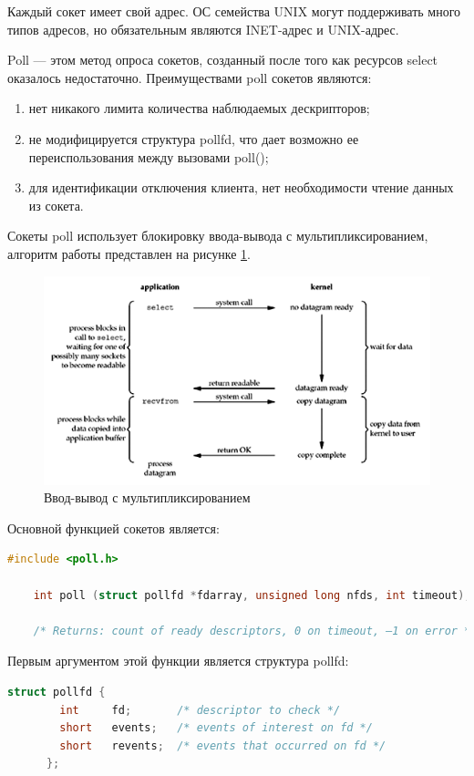 Каждый сокет имеет свой адрес.
ОС семейства UNIX могут поддерживать много типов адресов, но обязательным являются INET-адрес и UNIX-адрес.

Poll --- этом метод опроса сокетов, созданный после того как ресурсов select оказалось недостаточно.
Преимуществами poll сокетов являются:
\begin{enumerate}
    \item нет никакого лимита количества наблюдаемых дескрипторов;
    \item не модифицируется структура pollfd, что дает возможно ее переиспользования между вызовами poll();
    \item для идентификации отключения клиента, нет необходимости чтение данных из сокета.
\end{enumerate}

Сокеты poll использует блокировку ввода-вывода с мультипликсированием, алгоритм работы представлен на рисунке \ref{fig:anal:use-case}.

\begin{figure}[ht!]
	\centering
	\includegraphics[width=0.7\linewidth]{assets/images/figure_6.3.png}
	\caption{Ввод-вывод с мультипликсированием}
	\label{fig:anal:use-case}
\end{figure}
\FloatBarrier

Основной функцией сокетов является:

\begin{lstlisting}[language=c, label=some-code, caption=Функция poll]
    #include <poll.h>

    int poll (struct pollfd *fdarray, unsigned long nfds, int timeout);
    
    /* Returns: count of ready descriptors, 0 on timeout, –1 on error */
\end{lstlisting}

Первым аргументом этой функции является структура pollfd:

\begin{lstlisting}[language=c, label=some-code, caption=Структура pollfd]
    struct pollfd {
        int     fd;       /* descriptor to check */
        short   events;   /* events of interest on fd */
        short   revents;  /* events that occurred on fd */
      };
\end{lstlisting}

